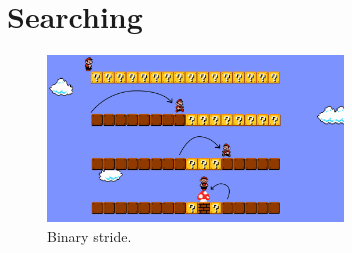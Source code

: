 
\chapter{Searching}	\label{chapter:searching}

\begin{figure}
  \centering
  \includegraphics[width = 0.70\textwidth]{figs/binary-stride}
  \caption{Binary stride.}
  \label{fig:binary-stride}
\end{figure}



